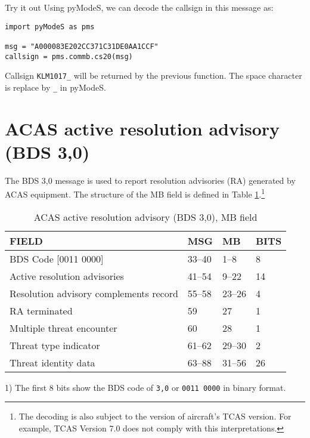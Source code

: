 \begin{notebox}{Try it out}
Using pyModeS, we can decode the callsign in this message as: 

\begin{verbatim}
import pyModeS as pms

msg = "A000083E202CC371C31DE0AA1CCF"
callsign = pms.commb.cs20(msg)
\end{verbatim}

Callsign \texttt{KLM1017\_} will be returned by the previous function. The space character is replace by \texttt{\_} in pyModeS.
\end{notebox}


\clearpage

\section{ACAS active resolution advisory (BDS 3,0)}

The BDS 3,0 message is used to report resolution advisories (RA) generated by ACAS equipment. The structure of the MB field is defined in Table \ref{tb:bds20}.\footnote{The decoding is also subject to the version of aircraft's TCAS version. For example, TCAS Version 7.0 does not comply with this interpretations.}

\begin{table}[ht]
\centering
\caption{ACAS active resolution advisory (BDS 3,0), MB field}
\label{tb:bds20}
\begin{tabular}{|l|l|l|l|}
\hline
\textbf{FIELD} & \textbf{MSG} & \textbf{MB} & \textbf{BITS} \\ \hline
BDS Code {[}0011 0000{]} & 33--40 & 1--8 & 8 \\ \hline
Active resolution advisories & 41--54 & 9--22 & 14 \\ \hline
Resolution advisory complements record & 55--58 & 23--26 & 4 \\ \hline
RA terminated & 59 & 27 & 1 \\ \hline
Multiple threat encounter & 60 & 28 & 1 \\ \hline
Threat type indicator & 61--62 & 29--30 & 2 \\ \hline
Threat identity data & 63--88 & 31--56 & 26 \\ \hline
\end{tabular}
\end{table}


1) The first 8 bits show the BDS code of \texttt{3,0} or \texttt{0011 0000} in binary format.

